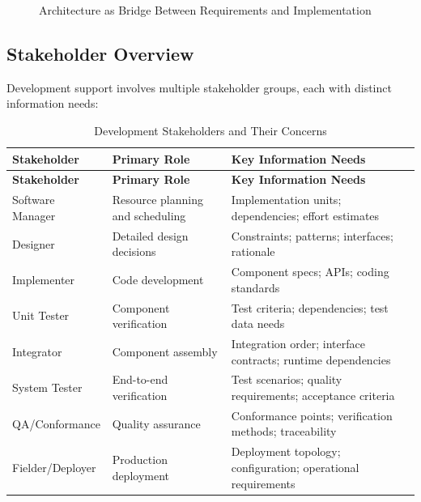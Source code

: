 \documentclass[11pt]{article}
\begin{document}
\begin{figure}[H]
\centering
{}
\caption{Architecture as Bridge Between Requirements and Implementation}
\end{figure}

\subsection{Stakeholder Overview}

Development support involves multiple stakeholder groups, each with distinct information needs:

\begin{longtable}{@{}L{3cm} L{4.5cm} L{5cm}@{}}
\caption{Development Stakeholders and Their Concerns} \\
\toprule
\textbf{Stakeholder} & \textbf{Primary Role} & \textbf{Key Information Needs} \\
\midrule
\endfirsthead
\toprule
\textbf{Stakeholder} & \textbf{Primary Role} & \textbf{Key Information Needs} \\
\midrule
\endhead
\bottomrule
\endlastfoot
Software Manager & Resource planning and scheduling & Implementation units; dependencies; effort estimates \\
Designer & Detailed design decisions & Constraints; patterns; interfaces; rationale \\
Implementer & Code development & Component specs; APIs; coding standards \\
Unit Tester & Component verification & Test criteria; dependencies; test data needs \\
Integrator & Component assembly & Integration order; interface contracts; runtime dependencies \\
System Tester & End-to-end verification & Test scenarios; quality requirements; acceptance criteria \\
QA/Conformance & Quality assurance & Conformance points; verification methods; traceability \\
Fielder/Deployer & Production deployment & Deployment topology; configuration; operational requirements \\
\end{longtable}
\end{document}
